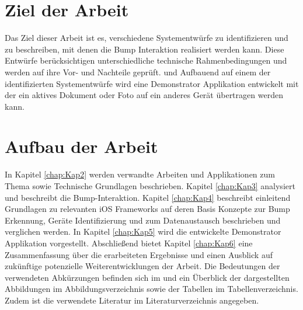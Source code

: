 \section{Ziel der Arbeit}
Das Ziel dieser Arbeit ist es, verschiedene Systementwürfe zu identifizieren und zu beschreiben, mit denen die Bump Interaktion realisiert werden kann. Diese Entwürfe berücksichtigen unterschiedliche technische Rahmenbedingungen und werden auf ihre Vor- und Nachteile geprüft. und Aufbauend auf einem der identifizierten Systementwürfe wird eine Demonstrator Applikation entwickelt mit der ein aktives Dokument oder Foto auf ein anderes Gerät übertragen werden kann.

\section{Aufbau der Arbeit}
In Kapitel \ref{chap:Kap2} werden verwandte Arbeiten und Applikationen zum Thema sowie Technische Grundlagen beschrieben. Kapitel \ref{chap:Kap3} analysiert und beschreibt die Bump-Interaktion. Kapitel \ref{chap:Kap4} beschreibt einleitend Grundlagen zu relevanten iOS Frameworks auf deren Basis  Konzepte zur Bump Erkennung, Geräte Identifizierung und zum Datenaustausch beschrieben und verglichen werden. In Kapitel \ref{chap:Kap5} wird die entwickelte Demonstrator Applikation vorgestellt. Abschließend bietet Kapitel \ref{chap:Kap6} eine Zusammenfassung über die erarbeiteten Ergebnisse und einen Ausblick auf zukünftige potenzielle Weiterentwicklungen der Arbeit. Die Bedeutungen der verwendeten Abkürzungen befinden sich im  und ein Überblick der dargestellten Abbildungen im Abbildungsverzeichnis sowie der Tabellen im Tabellenverzeichnis. Zudem ist die verwendete Literatur im Literaturverzeichnis angegeben.
